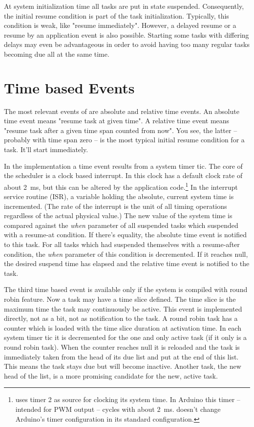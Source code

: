 At system initialization time all tasks are put in state suspended.
Consequently, the initial resume condition is part of the task
initialization. Typically, this condition is weak, like "resume
immediately". However, a delayed resume or a resume by an application
event is also possible. Starting some tasks with differing delays may even
be advantageous in order to avoid having too many regular tasks becoming
due all at the same time.


\section{Time based Events}
\label{secTimeBasedEvents}

The most relevant events of \rtos{} are absolute and relative time events.
An absolute time event means "resume task at given time". A relative time
event means "resume task after a given time span counted from now". You
see, the latter -- probably with time span zero -- is the most typical
initial resume condition for a task. It'll start immediately.

In the implementation a time event results from a system timer tic. The
core of the scheduler is a clock based interrupt. In \rtos{} this clock
has a default clock rate of about 2~ms, but this can be altered by the
application code.\footnote{\rtos uses timer 2 as source for clocking its
system time. In Arduino this timer -- intended for PWM output -- cycles
with about 2~ms. \rtos doesn't change Arduino's timer configuration in its
standard configuration.} In the interrupt service routine (ISR), a
variable holding the absolute, current system time is incremented. (The
rate of the interrupt is the unit of all timing operations regardless of
the actual physical value.) The new value of the system time is compared
against the \emph{when} parameter of all suspended tasks which suspended
with a resume-at condition. If there's equality, the absolute time event
is notified to this task. For all tasks which had suspended themselves
with a resume-after condition, the \emph{when} parameter of this condition
is decremented. If it reaches null, the desired suspend time has elapsed
and the relative time event is notified to the task.

The third time based event is available only if the system is compiled
with round robin feature. Now a task may have a time slice defined. The
time slice is the maximum time the task may continuously be active. This
event is implemented directly, not as a bit, not as notification to the
task. A round robin task has a counter which is loaded with the time slice
duration at activation time. In each system timer tic it is decremented
for the one and only active task (if it only is a round robin task). When
the counter reaches null it is reloaded and the task is immediately taken
from the head of its due list and put at the end of this list. This means
the task stays due but will become inactive. Another task, the new head of
the list, is a more promising candidate for the new, active task.

